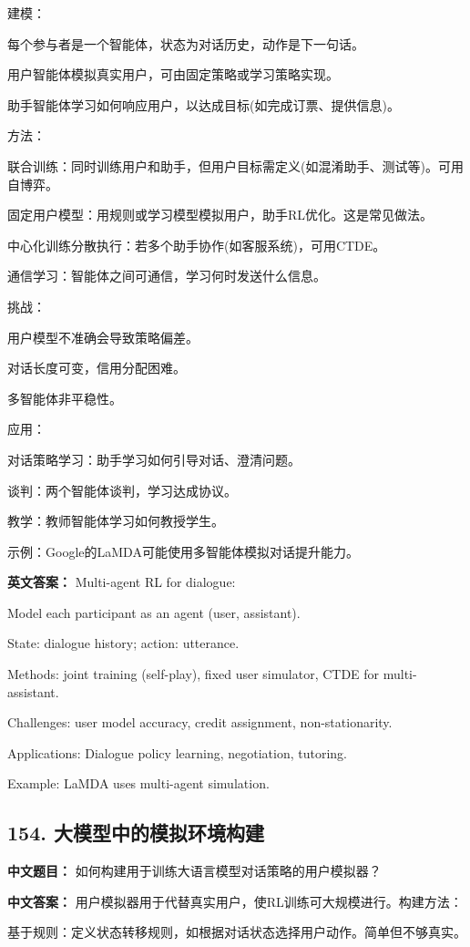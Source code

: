 \documentclass[10pt,a4paper]{ctexart}
\begin{document}
建模：

每个参与者是一个智能体，状态为对话历史，动作是下一句话。

用户智能体模拟真实用户，可由固定策略或学习策略实现。

助手智能体学习如何响应用户，以达成目标(如完成订票、提供信息)。

方法：

联合训练：同时训练用户和助手，但用户目标需定义(如混淆助手、测试等)。可用自博弈。

固定用户模型：用规则或学习模型模拟用户，助手RL优化。这是常见做法。

中心化训练分散执行：若多个助手协作(如客服系统)，可用CTDE。

通信学习：智能体之间可通信，学习何时发送什么信息。

挑战：

用户模型不准确会导致策略偏差。

对话长度可变，信用分配困难。

多智能体非平稳性。

应用：

对话策略学习：助手学习如何引导对话、澄清问题。

谈判：两个智能体谈判，学习达成协议。

教学：教师智能体学习如何教授学生。

示例：Google的LaMDA可能使用多智能体模拟对话提升能力。

\textbf{英文答案：}
Multi-agent RL for dialogue:

Model each participant as an agent (user, assistant).

State: dialogue history; action: utterance.

Methods: joint training (self-play), fixed user simulator, CTDE for multi-assistant.

Challenges: user model accuracy, credit assignment, non-stationarity.

Applications: Dialogue policy learning, negotiation, tutoring.

Example: LaMDA uses multi-agent simulation.

\subsection*{154. 大模型中的模拟环境构建}
\textbf{中文题目：} 如何构建用于训练大语言模型对话策略的用户模拟器？

\textbf{中文答案：}
用户模拟器用于代替真实用户，使RL训练可大规模进行。构建方法：

基于规则：定义状态转移规则，如根据对话状态选择用户动作。简单但不够真实。
\end{document}
